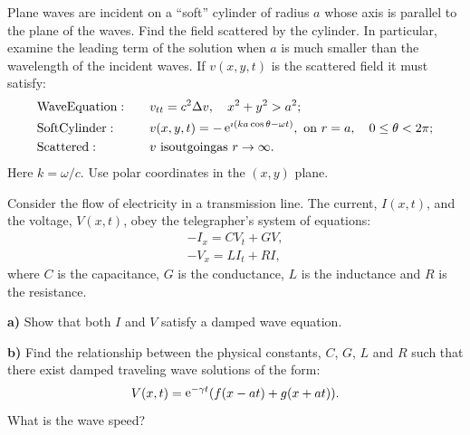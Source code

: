 {%
\begin{Exercise}
  Plane waves are incident on a ``soft'' cylinder of radius $a$ whose axis
  is parallel to the plane of the waves.  Find the field scattered by the 
  cylinder.  In particular, examine the leading term of the solution when
  $a$ is much smaller than the wavelength of the incident waves.
  If $v(x, y, t)$ is the scattered field it must satisfy:
  \begin{alignat*}{2}
    &\mathrm{Wave Equation:} &\quad &v_{t t} = c^2 \Delta v, \quad x^2 + y^2 > a^2;\\
    &\mathrm{Soft Cylinder:} &\quad &v(x, y, t) 
    = - \e^{\imath (k a \cos \theta - \omega t)},\ \mathrm{on}\ 
    r = a, \quad 0 \leq \theta < 2\pi; \\
    &\mathrm{Scattered:} &\quad &v\ \mathrm{is outgoing as}\ r \to \infty.
  \end{alignat*}
  Here $k = \omega / c$.  Use polar coordinates in the $(x, y)$ plane.
\end{Exercise}











\begin{Exercise}
  Consider the flow of electricity in a transmission line.  The current,
  $I(x, t)$, and the voltage, $V(x, t)$, obey the telegrapher's system of 
  equations:
  \begin{gather*}
    -I_x = C V_t + G V, \\
    -V_x = L I_t + R I,
  \end{gather*}
  where $C$ is the capacitance, $G$ is the conductance, $L$ is the inductance
  and $R$ is the resistance.

  \textbf{a)}  Show that both $I$ and $V$ satisfy a damped wave equation.

  \textbf{b)}  Find the relationship between the physical constants, $C$, $G$,
  $L$ and $R$ such that there exist damped traveling wave solutions of the
  form:
  \[
  V(x, t) = \mathop{\mathrm{e}}\nolimits^{-\gamma t} (f(x - a t) + g(x + a t)).
  \]
  What is the wave speed?
\end{Exercise}






\raggedbottom
}
